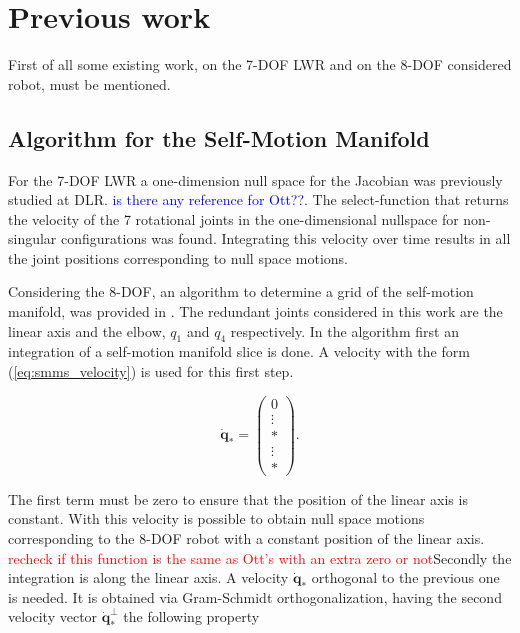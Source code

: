 \chapter{Previous work}
\label{ch:Previouswork}


First of all some existing work, on the 7-DOF LWR and on the 8-DOF considered robot, must be mentioned.



\section{Algorithm for the Self-Motion Manifold}
\label{sec:Fabianstuff}


For the 7-DOF LWR a  one-dimension null space for the Jacobian   was previously studied at DLR. \textcolor{blue}{is there any reference for Ott??}. 
The select-function that returns the velocity of the 7 rotational joints in the one-dimensional nullspace for non-singular configurations was found. Integrating this velocity over time results in all the joint positions corresponding to null space motions.


Considering the  8-DOF, an algorithm to determine a grid of the self-motion manifold, was provided in \cite{fabianthesis}. The redundant joints considered in this work are the linear axis and the elbow, $q_1$ and $q_4$ respectively. In the algorithm first an integration of a self-motion manifold slice is done. A velocity with the form (\ref{eq:smms_velocity}) is used for this first step. 

\begin{equation}
\dot{\mathbf{q}}_* =\begin{pmatrix}0 \\ \vdots  \\ *\\ \vdots\\ *\end{pmatrix}.
\label{eq:smms_velocity}
\end{equation} 

The first term must be zero to ensure that the position of the linear axis is constant.
With this velocity is possible to obtain null space motions corresponding to the 8-DOF robot with a constant position of the linear axis.
\textcolor{red}{recheck if this function is the same as Ott's with an extra zero or not}Secondly the integration is along the linear axis. A velocity $\dot{\mathbf{q}}_*$ orthogonal to the previous one is needed. It is obtained via Gram-Schmidt orthogonalization, having the second velocity vector $\dot{\mathbf{q}}_*^{\bot}$ the following property

